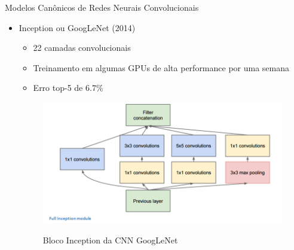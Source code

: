 \begin{frame}{Modelos Canônicos de Redes Neurais Convolucionais}
   \ \  \\[0.1cm]
   \begin{itemize}
     \item Inception ou GoogLeNet (2014)
     \begin{itemize}
       \item 22 camadas convolucionais
       \item Treinamento em algumas GPUs de alta performance por uma semana
       \item Erro top-5 de $6.7\%$
     \end{itemize}
     \begin{figure}[h!]
     	\centering
     	\caption{Bloco Inception da CNN GoogLeNet}
     	\includegraphics[width=0.7\linewidth]{img/GoogLeNet}
     	\label{fig:bloco_inception}
     \end{figure}
   \end{itemize}
\end{frame}

